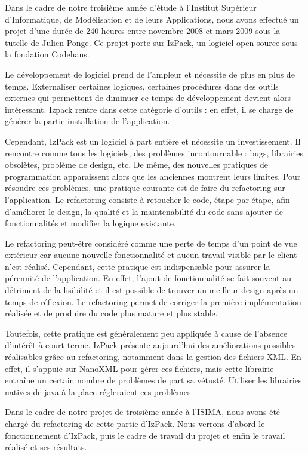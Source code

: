 Dans le cadre de notre troisième année d'étude à l'Institut Supérieur d'Informatique, de Modélisation et de leurs Applications, nous avons effectué un projet d'une durée de 240 heures entre novembre 2008 et mars 2009 sous la tutelle de Julien Ponge.
Ce projet porte sur IzPack, un logiciel open-source sous la fondation Codehaus.

Le développement de logiciel prend de l'ampleur et nécessite de plus en plus de temps.
Externaliser certaines logiques, certaines procédures dans des outils externes qui permettent de diminuer ce temps de développement devient alors intéressant.
Izpack rentre dans cette catégorie d'outils : en effet, il se charge de générer la partie installation de l'application.

Cependant, IzPack est un logiciel à part entière et nécessite un investissement.
Il rencontre comme tous les logiciels, des problèmes incontournable : bugs, librairies obsolètes, problème de design, etc.
De même, des nouvelles pratiques de programmation apparaissent alors que les anciennes montrent leurs limites.
Pour résoudre ces problèmes, une pratique courante est de faire du refactoring sur l'application.
Le refactoring consiste à retoucher le code, étape par étape, afin d'améliorer le design, la qualité et la maintenabilité du code sans ajouter de fonctionnalités et modifier la logique existante.

Le refactoring peut-être considéré comme une perte de temps d'un point de vue extérieur car aucune nouvelle fonctionnalité et aucun travail visible par le client n'est réalisé.
Cependant, cette pratique est indispensable pour assurer la pérennité de l'application.
En effet, l'ajout de fonctionnalité se fait souvent au détriment de la lisibilité et il est possible de trouver un meilleur design après un temps de réflexion.
Le refactoring permet de corriger la première implémentation réalisée et de produire du code plus mature et plus stable.

Toutefois, cette pratique est généralement peu appliquée à cause de l'absence d'intérêt à court terme.
IzPack présente aujourd'hui des améliorations possibles réalisables grâce au refactoring, notamment dans la gestion des fichiers XML.
En effet, il s'appuie sur NanoXML pour gérer ces fichiers, mais cette librairie entraîne un certain nombre de problèmes de part sa vétusté.
Utiliser les librairies natives de java à la place régleraient ces problèmes.

Dans le cadre de notre projet de troisième année à l'ISIMA, nous avons été chargé du refactoring de cette partie d'IzPack.
Nous verrons d'abord le fonctionnement d'IzPack, puis le cadre de travail du projet et enfin le travail réalisé et ses résultats.